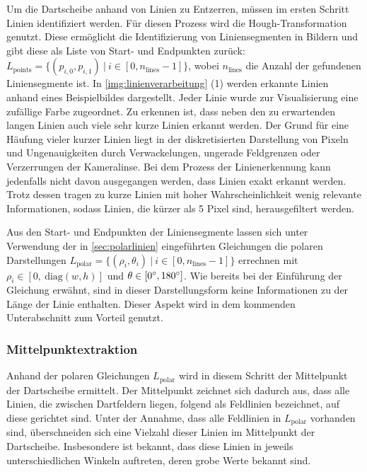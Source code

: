 Um die Dartscheibe anhand von Linien zu Entzerren, müssen im ersten Schritt Linien identifiziert werden. Für diesen Prozess wird die Hough-Transformation genutzt. Diese ermöglicht die Identifizierung von Liniensegmenten in Bildern und gibt diese als Liste von Start- und Endpunkten zurück: $L_\text{points} = \{(p_{i, 0}, p_{i, 1})\ \vert \ i \in [0, n_\text{lines}-1]\}$, wobei $n_\text{lines}$ die Anzahl der gefundenen Liniensegmente ist. In \autoref{img:linienverarbeitung} (1) werden erkannte Linien anhand eines Beispielbildes dargestellt. Jeder Linie wurde zur Visualisierung eine zufällige Farbe zugeordnet. Zu erkennen ist, dass neben den zu erwartenden langen Linien auch viele sehr kurze Linien erkannt werden. Der Grund für eine Häufung vieler kurzer Linien liegt in der diskretisierten Darstellung von Pixeln und Ungenauigkeiten durch Verwackelungen, ungerade Feldgrenzen oder Verzerrungen der Kameralinse. Bei dem Prozess der Linienerkennung kann jedenfalls nicht davon ausgegangen werden, dass Linien exakt erkannt werden. Trotz dessen tragen zu kurze Linien mit hoher Wahrscheinlichkeit wenig relevante Informationen, sodass Linien, die kürzer als 5 Pixel sind, herausgefiltert werden.

Aus den Start- und Endpunkten der Liniensegmente lassen sich unter Verwendung der in \autoref{sec:polarlinien} eingeführten Gleichungen die polaren Darstellungen $L_\text{polar} = \{(\rho_i, \theta_i)\ |\ i \in [0, n_\text{lines}-1]\}$ errechnen mit $\rho_i \in [0,\ \text{diag}(w, h)]$ und $\theta \in [0^{\circ}, 180^{\circ}]$. Wie bereits bei der Einführung der Gleichung erwähnt, sind in dieser Darstellungsform keine Informationen zu der Länge der Linie enthalten. Dieser Aspekt wird in dem kommenden Unterabschnitt zum Vorteil genutzt.

\subsubsection{Mittelpunktextraktion}
\label{sec:mittelpunktextraktion}

Anhand der polaren Gleichungen $L_\text{polar}$ wird in diesem Schritt der Mittelpunkt der Dartscheibe ermittelt. Der Mittelpunkt zeichnet sich dadurch aus, dass alle Linien, die zwischen Dartfeldern liegen, folgend als Feldlinien bezeichnet, auf diese gerichtet sind. Unter der Annahme, dass alle Feldlinien in $L_\text{polar}$ vorhanden sind, überschneiden sich eine Vielzahl dieser Linien im Mittelpunkt der Dartscheibe. Insbesondere ist bekannt, dass diese Linien in jeweils unterschiedlichen Winkeln auftreten, deren grobe Werte bekannt sind.

